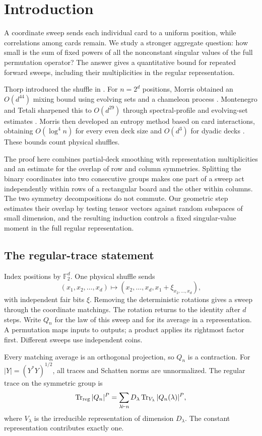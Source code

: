 \section{Introduction}
A coordinate sweep sends each individual card to a uniform position, while correlations among cards remain. We study a stronger aggregate question: how small is the sum of fixed powers of all the nonconstant singular values of the full permutation operator? The answer gives a quantitative bound for repeated forward sweeps, including their multiplicities in the regular representation.

Thorp introduced the shuffle in \cite{Thorp1973}. For $n=2^d$ positions, Morris obtained an $O(d^{44})$ mixing bound using evolving sets and a chameleon process \cite{Morris2008}. Montenegro and Tetali sharpened this to $O(d^{29})$ through spectral-profile and evolving-set estimates \cite[Section~6.4]{MontenegroTetali2006}. Morris then developed an entropy method based on card interactions, obtaining $O(\log^4 n)$ for every even deck size \cite{Morris2009} and $O(d^3)$ for dyadic decks \cite{Morris2013}. These bounds count physical shuffles.

The proof here combines partial-deck smoothing with representation multiplicities and an estimate for the overlap of row and column symmetries. Splitting the binary coordinates into two consecutive groups makes one part of a sweep act independently within rows of a rectangular board and the other within columns. The two symmetry decompositions do not commute. Our geometric step estimates their overlap by testing tensor vectors against random subspaces of small dimension, and the resulting induction controls a fixed singular-value moment in the full regular representation.

\subsection{The regular-trace statement}
Index positions by $\mathbb F_2^d$. One physical shuffle sends
\[
 (x_1,x_2,\ldots,x_d)\longmapsto
 (x_2,\ldots,x_d,x_1+\xi_{x_2,\ldots,x_d}),
\]
with independent fair bits $\xi$. Removing the deterministic rotations gives a sweep through the coordinate matchings. The rotation returns to the identity after $d$ steps. Write $Q_n$ for the law of this sweep and for its average in a representation. A permutation maps inputs to outputs; a product applies its rightmost factor first. Different sweeps use independent coins.

Every matching average is an orthogonal projection, so $Q_n$ is a contraction. For $|Y|=(Y^*Y)^{1/2}$, all traces and Schatten norms are unnormalized. The regular trace on the symmetric group is
\[
 \operatorname{Tr}_{\rm reg}|Q_n|^P
 =\sum_{\lambda\vdash n}D_\lambda
       \operatorname{Tr}_{V_\lambda}|Q_n(\lambda)|^P,
\]
where $V_\lambda$ is the irreducible representation of dimension $D_\lambda$. The constant representation contributes exactly one.

